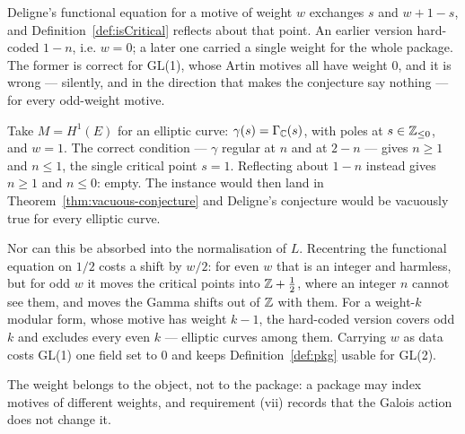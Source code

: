 \begin{remark}
  \label{rem:weight}
  Deligne's functional equation for a motive of weight $w$ exchanges $s$ and $w+1-s$, and
  Definition~\ref{def:isCritical} reflects about that point. An earlier version hard-coded
  $1-n$, i.e. $w = 0$; a later one carried a single weight for the whole package. The former is
  correct for GL(1), whose Artin motives all have weight $0$, and it
  is wrong --- silently, and in the direction that makes the conjecture say nothing --- for every
  odd-weight motive.

  Take $M = H^{1}(E)$ for an elliptic curve: $\gamma(s) = \Gamma_{\mathbb{C}}(s)$, with poles at
  $s \in \mathbb{Z}_{\leq 0}$, and $w = 1$. The correct condition --- $\gamma$ regular at $n$ and at
  $2-n$ --- gives $n \geq 1$ and $n \leq 1$, the single critical point $s=1$. Reflecting about
  $1-n$ instead gives $n \geq 1$ and $n \leq 0$: empty. The instance would then land in
  Theorem~\ref{thm:vacuous-conjecture} and Deligne's conjecture would be vacuously true for every
  elliptic curve.

  Nor can this be absorbed into the normalisation of $L$. Recentring the functional equation on
  $1/2$ costs a shift by $w/2$: for even $w$ that is an integer and harmless, but for odd $w$ it
  moves the critical points into $\mathbb{Z} + \tfrac12$, where an integer $n$ cannot see them, and moves
  the Gamma shifts out of $\mathbb{Z}$ with them. For a weight-$k$ modular form, whose motive has weight
  $k-1$, the hard-coded version covers odd $k$ and excludes every even $k$ --- elliptic curves
  among them. Carrying $w$ as data costs GL(1) one field set to $0$ and keeps
  Definition~\ref{def:pkg} usable for GL(2).

  The weight belongs to the object, not to the package: a package may index motives of
  different weights, and requirement (vii) records that the Galois action does not change it.
\end{remark}

